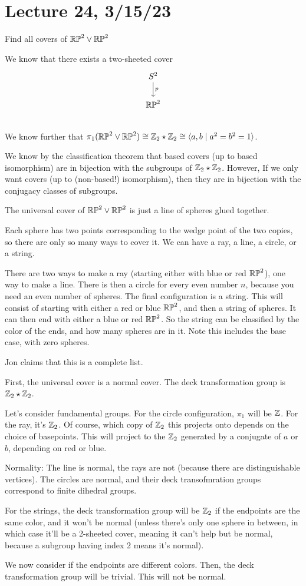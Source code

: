 \documentclass[x11names,reqno,14pt]{extarticle}
\begin{document}
\section*{Lecture 24, 3/15/23}

\exm

Find all covers of ${\mathbb{RP}}^2\vee{\mathbb{RP}}^2$

We know that there exists a two-sheeted cover
\[
\begin{tikzcd}
S^2 \ar[d, "p"] \\
\RP^2 \\
\end{tikzcd}
\]
We know further that $\pi_1({\mathbb{RP}}^2\vee{\mathbb{RP}}^2) \cong \mathbb{Z}_2\star\mathbb{Z}_2 \cong \langle a, b \mid a^2 = b^2 = 1\rangle$. 

We know by the classification theorem that based covers (up to based isomorphism) are in bijection with the subgroups of $\mathbb{Z}_2\star\mathbb{Z}_2$. However, If we only want covers (up to (non-based!) isomorphism), then they are in bijection with the conjugacy classes of subgroups. 

The universal cover of ${\mathbb{RP}}^2\vee{\mathbb{RP}}^2$ is just a line of spheres glued together. 

Each sphere has two points corresponding to the wedge point of the two copies, so there are only so many ways to cover it. We can have a ray, a line, a circle, or a string.

There are two ways to make a ray (starting either with blue or red ${\mathbb{RP}}^2$), one way to make a line. There is then a circle for every even number $n$, because you need an even number of spheres. The final configuration is a string. This will consist of starting with either a red or blue ${\mathbb{RP}}^2$, and then a string of spheres. It can then end with either a blue or red ${\mathbb{RP}}^2$. So the string can be classified by the color of the ends, and how many spheres are in it. Note this includes the base case, with zero spheres. 

Jon claims that this is a complete list.

First, the universal cover is a normal cover. The deck transformation group is $\mathbb{Z}_2\star\mathbb{Z}_2$. 

Let's consider fundamental groups. For the circle configuration, $\pi_1$ will be $\mathbb{Z}$. For the ray, it's $\mathbb{Z}_2$. Of course, which copy of $\mathbb{Z}_2$ this projects onto depends on the choice of basepoints. This will project to the $\mathbb{Z}_2$ generated by a conjugate of $a$ or $b$, depending on red or blue. 

Normality: The line is normal, the rays are not (because there are distinguishable vertices). The circles are normal, and their deck transofmration groups correspond to finite dihedral groups. 

For the strings, the deck transformation group will be $\mathbb{Z}_2$ if the endpoints are the same color, and it won't be normal (unless there's only one sphere in between, in which case it'll be a 2-sheeted cover, meaning it can't help but be normal, because a subgroup having index 2 means it's normal). 

We now consider if the endpoints are different colors. Then, the deck transformation group will be trivial. This will not be normal. 
\end{document}
